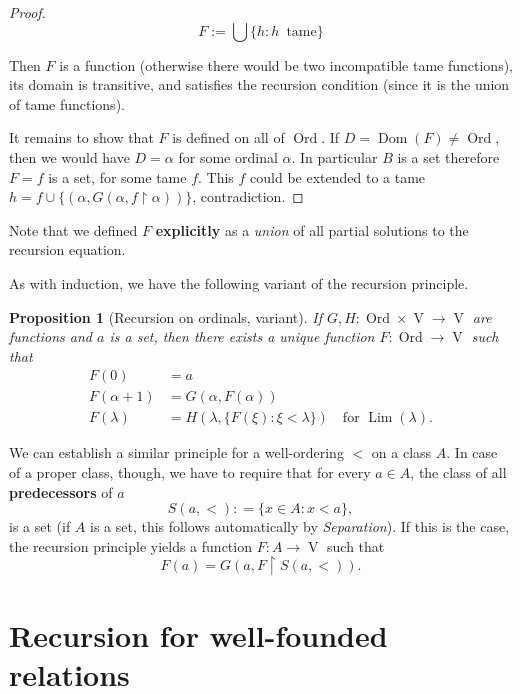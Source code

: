 \documentclass{article}
\newcommand{\Ord}{\operatorname{Ord}}
\newcommand{\V}{\Op{V}}
\newcommand{\Rest}[1]{\upharpoonright{#1}}
\newcommand{\Op}[1]{\operatorname{#1}}
\newtheorem{proposition}{Proposition}[section]
\begin{document}
\begin{proof}
\begin{equation}
F := \bigcup \{h \colon h\, \text{ tame}\}
\end{equation}

Then $F$ is a function (otherwise there would be two incompatible tame functions), its domain is transitive, and satisfies the recursion condition (since it is the union of tame functions).

It remains to show that $F$ is defined on all of $\Ord$.
If $D = \Op{Dom}(F) \neq \Ord$, then we would have $D = \alpha$ for some ordinal ${}\alpha$. In particular $B$ is a set therefore $F = f$ is a set, for some tame $f$. This $f$ could be extended to a tame $h = f \cup \{(\alpha,G(\alpha,f \Rest{\alpha}))\}$, contradiction.

\end{proof}Note that we defined $F$ \textbf{explicitly} as a \textit{union} of all partial solutions to the recursion equation.

As with induction, we have the following variant of the recursion principle.

\begin{proposition}[Recursion on ordinals, variant]\label{prop-ordinal-recursion-ii}If $G, H: \Ord \times \V \longrightarrow  \V$ are functions and $a$ is a set, then there exists a unique function $F: \Ord \longrightarrow \V$  such that
\begin{align*} 
    F(0) \quad & =  a\\ 
    F(\alpha+1) & =  G(\alpha,F(\alpha)) \\    
    F(\lambda) \quad & =  H(\lambda, \{F(\xi) \colon \xi<\lambda \}) \quad \text{for } \Op{Lim}(\lambda).
\end{align*}
\end{proposition}We can establish a similar principle for a well-ordering $<$ on a class $A$. In case of a proper class, though, we have to require that for every $a \in A$,  the class of all \textbf{predecessors} of $a$
\begin{equation*}
S(a,<): = \{x \in A\colon x < a \},
\end{equation*}
is a set (if $A$ is a set, this follows automatically by \textit{Separation}). If this is the case, the recursion principle yields a function $F: A \to \V$ such that
\begin{equation*}
F(a) = G(a,F\Rest{S(a,<)}).
\end{equation*}

\section{Recursion for well-founded relations}
\end{document}
